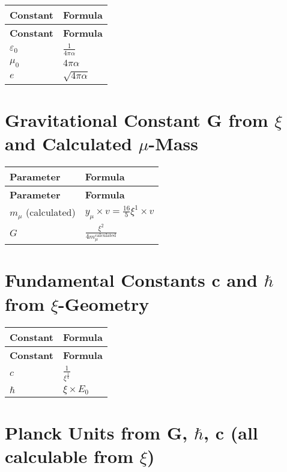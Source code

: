 \documentclass[12pt,a4paper]{article}
\begin{document}
	\begin{longtable}{|p{3cm}|p{4cm}|}
		\hline
		\textbf{Constant} & \textbf{Formula} \\
		\hline
		\endfirsthead
		\hline
		\textbf{Constant} & \textbf{Formula} \\
		\hline
		\endhead
		\(\varepsilon_0\) & \(\frac{1}{4\pi\alpha}\) \\
		\hline
		\(\mu_0\) & \(4\pi\alpha\) \\
		\hline
		\(e\) & \(\sqrt{4\pi\alpha}\) \\
		\hline
	\end{longtable}
	
	\section{Gravitational Constant G from \(\xi\) and Calculated \(\mu\)-Mass}
	
	\begin{longtable}{|p{3cm}|p{5cm}|}
		\hline
		\textbf{Parameter} & \textbf{Formula} \\
		\hline
		\endfirsthead
		\hline
		\textbf{Parameter} & \textbf{Formula} \\
		\hline
		\endhead
		\(m_{\mu}\) (calculated) & \(y_{\mu} \times v = \frac{16}{5}\xi^{1} \times v\) \\
		\hline
		\(G\) & \(\frac{\xi^{2}}{4m_{\mu}^{\text{calculated}}}\) \\
		\hline
	\end{longtable}
	
	\section{Fundamental Constants c and \(\hbar\) from \(\xi\)-Geometry}
	
	\begin{longtable}{|p{3cm}|p{5cm}|}
		\hline
		\textbf{Constant} & \textbf{Formula} \\
		\hline
		\endfirsthead
		\hline
		\textbf{Constant} & \textbf{Formula} \\
		\hline
		\endhead
		\(c\) & \(\frac{1}{\xi^{\frac{1}{4}}}\) \\
		\hline
		\(\hbar\) & \(\xi \times E_0\) \\
		\hline
	\end{longtable}
	
	\section{Planck Units from G, \(\hbar\), c (all calculable from \(\xi\))}
	
\end{document}
